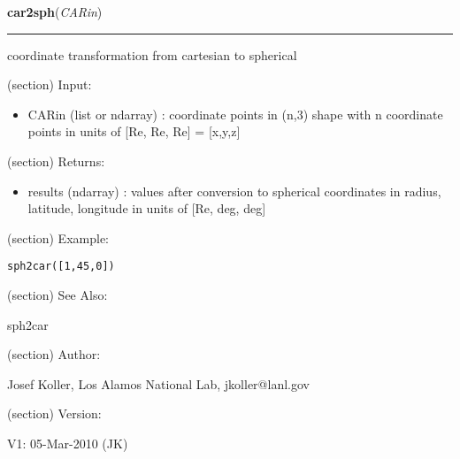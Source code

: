     \label{spacepy:onerapy:car2sph}

    \vspace{0.5ex}

\hspace{.8\funcindent}\begin{boxedminipage}{\funcwidth}

    \raggedright \textbf{car2sph}(\textit{CARin})

    \vspace{-1.5ex}

    \rule{\textwidth}{0.5\fboxrule}
\setlength{\parskip}{2ex}
    coordinate transformation from cartesian to spherical

    (section) Input:

      \begin{itemize}
      \setlength{\parskip}{0.6ex}
        \item CARin (list or ndarray) : coordinate points in (n,3) shape with n
          coordinate points in units of [Re, Re, Re] = [x,y,z]

      \end{itemize}

    (section) Returns:

      \begin{itemize}
      \setlength{\parskip}{0.6ex}
        \item results (ndarray) : values after conversion to spherical 
          coordinates in radius, latitude, longitude in units of [Re, deg, 
          deg]

      \end{itemize}

    (section) Example:

\begin{alltt}
\pysrcprompt{{\textgreater}{\textgreater}{\textgreater} }sph2car([1,45,0])
\end{alltt}
    (section) See Also:

      sph2car

    (section) Author:

      Josef Koller, Los Alamos National Lab, jkoller@lanl.gov

    (section) Version:

      V1: 05-Mar-2010 (JK)

\setlength{\parskip}{1ex}
    \end{boxedminipage}

